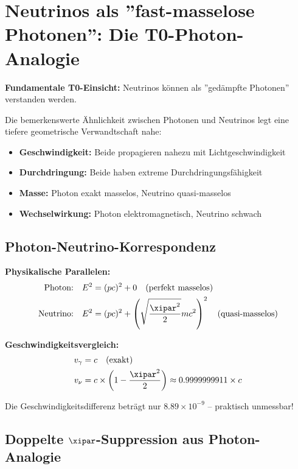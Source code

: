 	\section{Neutrinos als ''fast-masselose Photonen'': Die T0-Photon-Analogie}
	
	\begin{speculation}
		\textbf{Fundamentale T0-Einsicht:} Neutrinos können als ''gedämpfte Photonen'' verstanden werden.
		
		Die bemerkenswerte Ähnlichkeit zwischen Photonen und Neutrinos legt eine tiefere geometrische Verwandtschaft nahe:
		\begin{itemize}
			\item \textbf{Geschwindigkeit:} Beide propagieren nahezu mit Lichtgeschwindigkeit
			\item \textbf{Durchdringung:} Beide haben extreme Durchdringungsfähigkeit
			\item \textbf{Masse:} Photon exakt masselos, Neutrino quasi-masselos
			\item \textbf{Wechselwirkung:} Photon elektromagnetisch, Neutrino schwach
		\end{itemize}
	\end{speculation}
	
	\subsection{Photon-Neutrino-Korrespondenz}
	
	\begin{important}
		\textbf{Physikalische Parallelen:}
		\begin{align}
			\text{Photon:} \quad &E^2 = (pc)^2 + 0 \quad \text{(perfekt masselos)} \\
			\text{Neutrino:} \quad &E^2 = (pc)^2 + \left(\sqrt{\frac{\xipar^2}{2}} m c^2\right)^2 \quad \text{(quasi-masselos)}
		\end{align}
		
		\textbf{Geschwindigkeitsvergleich:}
		\begin{align}
			v_\gamma &= c \quad \text{(exakt)} \\
			v_\nu &= c \times \left(1 - \frac{\xipar^2}{2}\right) \approx 0.9999999911 \times c
		\end{align}
		
		Die Geschwindigkeitsdifferenz beträgt nur \(8.89 \times 10^{-9}\) -- praktisch unmessbar!
	\end{important}
	
	\subsection{Doppelte \(\xipar\)-Suppression aus Photon-Analogie}
	
